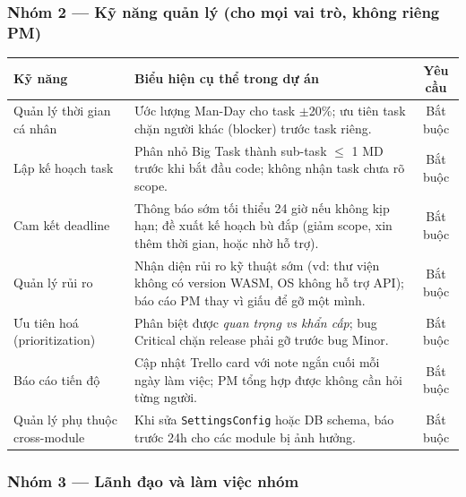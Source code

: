 \documentclass[12pt,a4paper]{article}
\begin{document}
\subsubsection{Nhóm 2 --- Kỹ năng quản lý (cho mọi vai trò, không riêng PM)}

\begin{tabularx}{\linewidth}{|l|X|c|}
\hline
\rowcolor{gray!20}
\textbf{Kỹ năng} & \textbf{Biểu hiện cụ thể trong dự án} & \textbf{Yêu cầu} \\
\hline
Quản lý thời gian cá nhân & Ước lượng Man-Day cho task $\pm$20\%; ưu tiên task
                            chặn người khác (blocker) trước task riêng. & Bắt buộc \\
\hline
Lập kế hoạch task & Phân nhỏ Big Task thành sub-task $\le$ 1 MD trước khi bắt đầu code;
                    không nhận task chưa rõ scope. & Bắt buộc \\
\hline
Cam kết deadline & Thông báo sớm tối thiểu 24 giờ nếu không kịp hạn; đề xuất kế hoạch
                   bù đắp (giảm scope, xin thêm thời gian, hoặc nhờ hỗ trợ). & Bắt buộc \\
\hline
Quản lý rủi ro & Nhận diện rủi ro kỹ thuật sớm (vd: thư viện không có version WASM, OS
                 không hỗ trợ API); báo cáo PM thay vì giấu để gỡ một mình. & Bắt buộc \\
\hline
Ưu tiên hoá (prioritization) & Phân biệt được \textit{quan trọng vs khẩn cấp};
                                bug Critical chặn release phải gỡ trước bug Minor. & Bắt buộc \\
\hline
Báo cáo tiến độ & Cập nhật Trello card với note ngắn cuối mỗi ngày làm việc;
                  PM tổng hợp được không cần hỏi từng người. & Bắt buộc \\
\hline
Quản lý phụ thuộc cross-module & Khi sửa \texttt{SettingsConfig} hoặc DB schema, báo
                                  trước 24h cho các module bị ảnh hưởng. & Bắt buộc \\
\hline
\end{tabularx}

\subsubsection{Nhóm 3 --- Lãnh đạo và làm việc nhóm}
\end{document}
